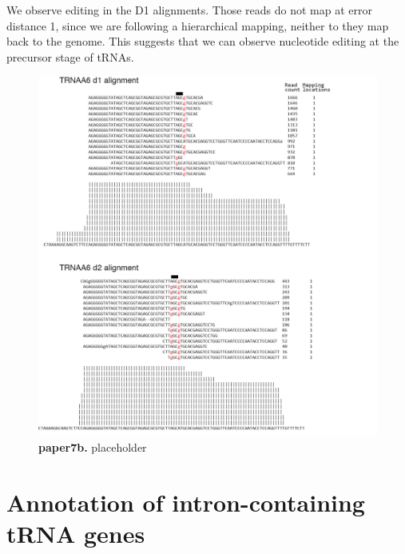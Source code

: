 \documentclass[12pt]{rockefeller}
\begin{document}
We observe editing in the D1 alignments. Those reads do not map at error distance 1, since we are following a hierarchical mapping, neither to they map back to the genome. This suggests that we can observe nucleotide editing at the precursor stage of tRNAs. 

\begin{figure}[!ht]%
\centering
\includegraphics[width = 5in]{paper7b.png}%
\caption[paper7b]
{\textbf{paper7b.}
placeholder}
\centering
\label{paper7b}%
\end{figure}

\section{Annotation of intron-containing tRNA genes}
\end{document}
